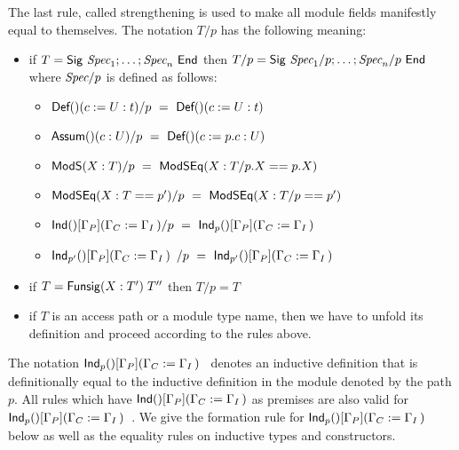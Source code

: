 The last rule, called strengthening is used to make all module fields
manifestly equal to themselves. The notation $T/p$ has the following
meaning:
\begin{itemize}
\item if $T={\sf Sig}~\textit{Spec}_1;\dots;\textit{Spec}_n~{\sf End}$ then
  $T/p={\sf Sig}~\textit{Spec}_1/p;\dots;\textit{Spec}_n/p~{\sf End}$ where $\textit{Spec}/p$ is defined as
  follows:
  \begin{itemize}
  \item $\mbox{{\sf Def}$()(c:=U:t)$}/p ~=~ \mbox{{\sf Def}$()(c:=U:t)$}$
  \item $\mbox{{\sf Assum}$()(c:U)$}/p ~=~ \mbox{{\sf Def}$()(c:=p.c:U)$}$
  \item ${\sf ModS}({X}:{T})/p ~=~ {\sf ModSEq}({X}:{T/p.X}=={p.X})$
  \item ${\sf ModSEq}({X}:{T}=={p'})/p ~=~ {\sf ModSEq}({X}:{T/p}=={p'})$
  \item $\Ind{}{\Gamma_P}{\Gamma_C}{\Gamma_I}/p ~=~ \Indp{}{\Gamma_P}{\Gamma_C}{\Gamma_I}{p}$
  \item $\Indp{}{\Gamma_P}{\Gamma_C}{\Gamma_I}{p'}/p ~=~ \Indp{}{\Gamma_P}{\Gamma_C}{\Gamma_I}{p'}$
  \end{itemize}
\item if $T={\sf Funsig}(X:T')\;T''$ then $T/p=T$
\item if $T$ is an access path or a module type name, then we have to
  unfold its definition and proceed according to the rules above. 
\end{itemize}
The notation $\Indp{}{\Gamma_P}{\Gamma_C}{\Gamma_I}{p}$ denotes an
inductive definition that is definitionally equal to the inductive
definition in the module denoted by the path $p$. All rules which have
$\Ind{}{\Gamma_P}{\Gamma_C}{\Gamma_I}$ as premises are also valid for 
$\Indp{}{\Gamma_P}{\Gamma_C}{\Gamma_I}{p}$. We give the formation rule
for $\Indp{}{\Gamma_P}{\Gamma_C}{\Gamma_I}{p}$ below as well as
the equality rules on inductive types and constructors. 

